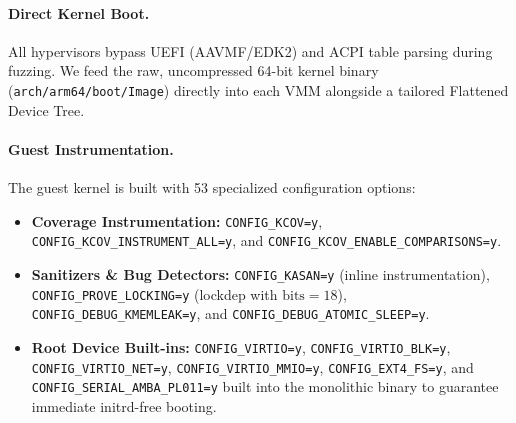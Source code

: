 \documentclass{article}
\begin{document}
\paragraph{Direct Kernel Boot.}
All hypervisors bypass UEFI (AAVMF/EDK2) and ACPI table parsing during fuzzing. We feed the raw, uncompressed 64-bit kernel binary (\texttt{arch/arm64/boot/Image}) directly into each VMM alongside a tailored Flattened Device Tree.

\paragraph{Guest Instrumentation.}
The guest kernel is built with 53 specialized configuration options:
\begin{itemize}[leftmargin=*]
    \item \textbf{Coverage Instrumentation:} \texttt{CONFIG\_KCOV=y}, \texttt{CONFIG\_KCOV\_INSTRUMENT\_ALL=y}, and \texttt{CONFIG\_KCOV\_ENABLE\_COMPARISONS=y}.
    \item \textbf{Sanitizers \& Bug Detectors:} \texttt{CONFIG\_KASAN=y} (inline instrumentation), \texttt{CONFIG\_PROVE\_LOCKING=y} (lockdep with $\text{bits}=18$), \texttt{CONFIG\_DEBUG\_KMEMLEAK=y}, and \texttt{CONFIG\_DEBUG\_ATOMIC\_SLEEP=y}.
    \item \textbf{Root Device Built-ins:} \texttt{CONFIG\_VIRTIO=y}, \texttt{CONFIG\_VIRTIO\_BLK=y}, \texttt{CONFIG\_VIRTIO\_NET=y}, \texttt{CONFIG\_VIRTIO\_MMIO=y}, \texttt{CONFIG\_EXT4\_FS=y}, and \texttt{CONFIG\_SERIAL\_AMBA\_PL011=y} built into the monolithic binary to guarantee immediate initrd-free booting.
\end{itemize}
\end{document}
